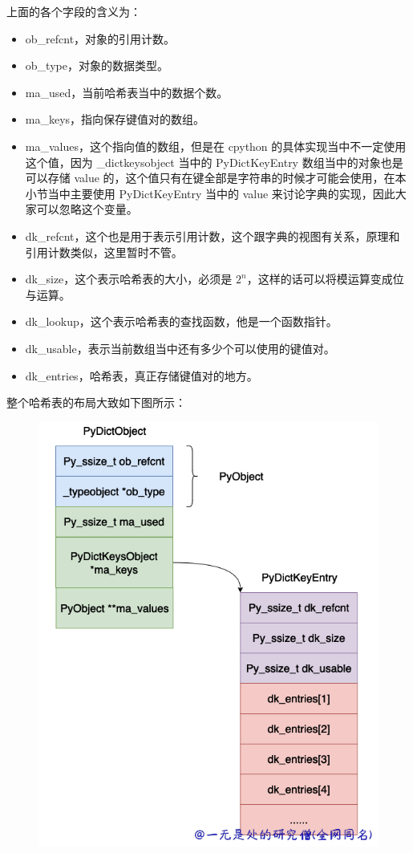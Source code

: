 上面的各个字段的含义为：
\begin{itemize}
\item ob\_refcnt，对象的引用计数。 
\item ob\_type，对象的数据类型。 
\item ma\_used，当前哈希表当中的数据个数。 
\item ma\_keys，指向保存键值对的数组。 
\item ma\_values，这个指向值的数组，但是在 cpython 的具体实现当中不一定使用这个值，因为 \_dictkeysobject 当中的 PyDictKeyEntry 数组当中的对象也是可以存储 value 的，这个值只有在键全部是字符串的时候才可能会使用，在本小节当中主要使用 PyDictKeyEntry 当中的 value 来讨论字典的实现，因此大家可以忽略这个变量。 
\item dk\_refcnt，这个也是用于表示引用计数，这个跟字典的视图有关系，原理和引用计数类似，这里暂时不管。 
\item dk\_size，这个表示哈希表的大小，必须是 $2^n$，这样的话可以将模运算变成位与运算。 
\item dk\_lookup，这个表示哈希表的查找函数，他是一个函数指针。 
\item dk\_usable，表示当前数组当中还有多少个可以使用的键值对。 
\item dk\_entries，哈希表，真正存储键值对的地方。 
\end{itemize}
整个哈希表的布局大致如下图所示：

    \begin{figure}[h]
        \centering
            \includegraphics[scale=.25]{images/27-dict.png}
            \caption{ }
        \label{fig:my_label}
    \end{figure}
    
